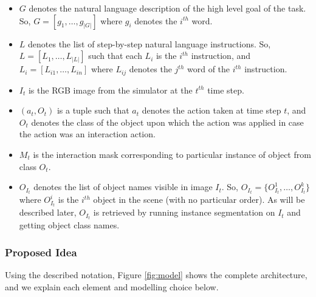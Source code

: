 \documentclass[11pt,a4paper]{article}
\begin{document}
\begin{itemize}
    \item $G$ denotes the natural language description of the high level goal of the task. So, $G = [g_1, \dots, g_{|G|}]$ where $g_i$ denotes the $i^{th}$ word.
    \item $L$ denotes the list of step-by-step natural language instructions. So, $L = [L_1, \dots, L_{|L|}]$ such that each $L_i$ is the $i^{th}$ instruction, and $L_i = [L_{i1}, \dots, L_{in}]$ where $L_{ij}$ denotes the $j^{th}$ word of the $i^{th}$ instruction.
    \item $I_t$ is the RGB image from the simulator at the $t^{th}$ time step.
    \item $(a_t, O_t)$ is a tuple such that $a_t$ denotes the action taken at time step $t$, and $O_t$ denotes the class of the object upon which the action was applied in case the action was an interaction action.
    \item $M_t$ is the interaction mask corresponding to particular instance of object from class $O_t$.
    \item $O_{I_t}$ denotes the list of object names visible in image $I_t$. So, $O_{I_t} = \{O_{I_t}^1, \dots, O_{I_t}^k\}$ where $O_{I_t}^i$ is the $i^{th}$ object in the scene (with no particular order). As will be described later, $O_{I_t}$ is retrieved by running instance segmentation \cite{he2017mask} on $I_t$ and getting object class names.
\end{itemize}

\subsubsection{Proposed Idea}
\label{sssec:proposed}
Using the described notation, Figure \ref{fig:model} shows the complete architecture, and we explain each element and modelling choice below.
\end{document}
